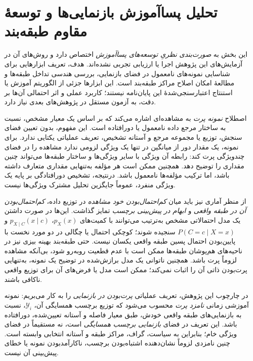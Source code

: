 \section{تحلیل پساآموزش بازنمایی‌ها و توسعهٔ مقاوم طبقه‌بند}
\label{cmp:sec:ch3-outliers}
این بخش به \emph{صورت‌بندی نظریِ توسعه‌های پساآموزش}
اختصاص دارد و روش‌های آن در آزمایش‌های این
پژوهش اجرا یا ارزیابی تجربی نشده‌اند.
هدف، تعریف ابزارهایی برای شناسایی نمونه‌های
نامعمول در فضای بازنمایی، بررسی هندسی تداخل
طبقه‌ها و مطالعهٔ امکان اصلاح مراکز طبقه‌بند است.
این ابزارها جزئی از الگوریتم آموزش یا استنتاج
اعتبارسنجی‌شدهٔ این پایان‌نامه نیستند؛
کاربرد عملی و اثر احتمالی آن‌ها بر دقت،
به آزمون مستقل در پژوهش‌های بعدی نیاز دارد.

اصطلاح \emph{نمونه پرت} به مشاهده‌ای
اشاره می‌کند که بر اساس یک معیار مشخص،
نسبت به ساختار مرجع داده نامعمول
یا دورافتاده است. این مفهوم، بدون
تعیین فضای سنجش، توزیع یا مجموعه
مرجع و آستانه تشخیص، تعریف عملیاتی
یکتایی ندارد. برای نمونه، یک مقدار
دور از میانگین در تنها یک ویژگی
لزومی ندارد مشاهده را در فضای
چندویژگی پرت کند: رابطه آن ویژگی
با سایر ویژگی‌ها و ساختار طبقه‌ها
می‌تواند چنین مقداری را توضیح دهد.
همچنین ممکن است هر مؤلفه به‌تنهایی
مقداری متعارف داشته باشد، اما
ترکیب مؤلفه‌ها نامعمول باشد.
درنتیجه، تشخیص دورافتادگی
بر پایه یک ویژگی منفرد، عموماً
جایگزین تحلیل مشترک ویژگی‌ها نیست.

از منظر آماری نیز باید میان
\emph{کم‌احتمال‌بودن خود مشاهده}
در توزیع داده، \emph{کم‌احتمال‌بودن
آن در طبقه واقعی} و
\emph{ابهام در پیش‌بینی برچسب}
تمایز گذاشت. این‌ها در صورت
داشتن یک مدل احتمالاتی مشخص
به‌ترتیب می‌توانند با کمیت‌های
$p_X(x)$، $p_{X\mid C}(x\mid c)$
و $P(C=c\mid X=x)$ سنجیده شوند؛
کوچکی احتمال یا چگالی در دو
مورد نخست با پایین‌بودن احتمال
پسین طبقه واقعی یکسان نیست.
حتی طبقه‌بند بهینه بیزی نیز
در ناحیه‌های هم‌پوشان طبقه‌ها
ممکن است با عدم قطعیت روبه‌رو شود،
بی‌آنکه مشاهده لزوماً پرت باشد.
همچنین ناتوانی یک مدل برازش‌شده
در توضیح یک نمونه، به‌تنهایی
پرت‌بودن ذاتی آن را اثبات نمی‌کند؛
ممکن است مدل یا فرض‌های آن
برای توزیع واقعی ناکافی باشند.

در چارچوب این پژوهش، تعریف
عملیاتی \emph{پرت‌بودن در بازنمایی}
را به کار می‌بریم: نمونه آموزشی
زمانی \emph{نامزد پرت} محسوب
می‌شود که توزیع برچسب همسایگی
آن، $\mathscr Y_i$، نسبت به
بازنمایی‌های طبقه واقعی خودش،
طبق معیار فاصله و آستانه تعیین‌شده،
دورافتاده باشد. این تعریف در
فضای \emph{بازنمایی برچسب همسایگی}
است، نه مستقیماً در فضای ویژگی
خام؛ بنابراین به سیاست، گراف،
مراکز طبقه و آستانه انتخابی
وابسته است. چنین نامزدی لزوماً
نشان‌دهنده اشتباه‌بودن برچسب،
ناکارآمدبودن نمونه یا خطای
پیش‌بینی آن نیست.

